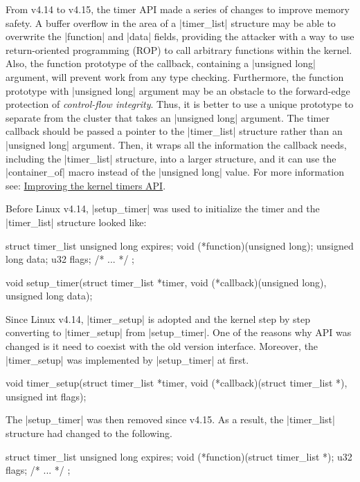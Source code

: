 \documentclass[10pt, oneside]{book}
\begin{document}
From v4.14 to v4.15, the timer API made a series of changes to improve memory safety.
A buffer overflow in the area of a \cpp|timer_list| structure may be able to overwrite the \cpp|function| and \cpp|data| fields, providing the attacker with a way to use return-oriented programming (ROP) to call arbitrary functions within the kernel.
Also, the function prototype of the callback, containing a \cpp|unsigned long| argument, will prevent work from any type checking.
Furthermore, the function prototype with \cpp|unsigned long| argument may be an obstacle to the forward-edge protection of \textit{control-flow integrity}.
Thus, it is better to use a unique prototype to separate from the cluster that takes an \cpp|unsigned long| argument.
The timer callback should be passed a pointer to the \cpp|timer_list| structure rather than an \cpp|unsigned long| argument.
Then, it wraps all the information the callback needs, including the \cpp|timer_list| structure, into a larger structure, and it can use the \cpp|container_of| macro instead of the \cpp|unsigned long| value.
For more information see: \href{https://lwn.net/Articles/735887/}{Improving the kernel timers API}.

Before Linux v4.14, \cpp|setup_timer| was used to initialize the timer and the \cpp|timer_list| structure looked like:
\begin{code}
struct timer_list {
    unsigned long expires;
    void (*function)(unsigned long);
    unsigned long data;
    u32 flags;
    /* ... */
};

void setup_timer(struct timer_list *timer, void (*callback)(unsigned long),
                 unsigned long data);
\end{code}

Since Linux v4.14, \cpp|timer_setup| is adopted and the kernel step by step converting to \cpp|timer_setup| from \cpp|setup_timer|.
One of the reasons why API was changed is it need to coexist with the old version interface.
Moreover, the \cpp|timer_setup| was implemented by \cpp|setup_timer| at first.
\begin{code}
void timer_setup(struct timer_list *timer,
                 void (*callback)(struct timer_list *), unsigned int flags);
\end{code}

The \cpp|setup_timer| was then removed since v4.15.
As a result, the \cpp|timer_list| structure had changed to the following.
\begin{code}
struct timer_list {
    unsigned long expires;
    void (*function)(struct timer_list *);
    u32 flags;
    /* ... */
};
\end{code}
\end{document}
